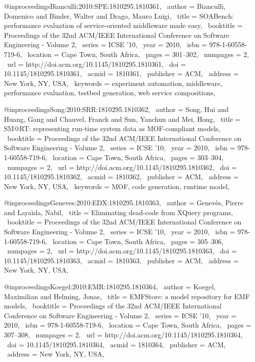 @inproceedings{Bianculli:2010:SPE:1810295.1810361,
 author = {Bianculli, Domenico and Binder, Walter and Drago, Mauro Luigi},
 title = {SOABench: performance evaluation of service-oriented middleware made easy},
 booktitle = {Proceedings of the 32nd ACM/IEEE International Conference on Software Engineering - Volume 2},
 series = {ICSE '10},
 year = {2010},
 isbn = {978-1-60558-719-6},
 location = {Cape Town, South Africa},
 pages = {301--302},
 numpages = {2},
 url = {http://doi.acm.org/10.1145/1810295.1810361},
 doi = {10.1145/1810295.1810361},
 acmid = {1810361},
 publisher = {ACM},
 address = {New York, NY, USA},
 keywords = {experiment automation, middleware, performance evaluation, testbed generation, web service compositions},
} 

@inproceedings{Song:2010:SRR:1810295.1810362,
 author = {Song, Hui and Huang, Gang and Chauvel, Franck and Sun, Yanchun and Mei, Hong},
 title = {SM@RT: representing run-time system data as MOF-compliant models},
 booktitle = {Proceedings of the 32nd ACM/IEEE International Conference on Software Engineering - Volume 2},
 series = {ICSE '10},
 year = {2010},
 isbn = {978-1-60558-719-6},
 location = {Cape Town, South Africa},
 pages = {303--304},
 numpages = {2},
 url = {http://doi.acm.org/10.1145/1810295.1810362},
 doi = {10.1145/1810295.1810362},
 acmid = {1810362},
 publisher = {ACM},
 address = {New York, NY, USA},
 keywords = {MOF, code generation, runtime model},
} 

@inproceedings{Geneves:2010:EDX:1810295.1810363,
 author = {Genev\`{e}s, Pierre and Laya\"{\i}da, Nabil},
 title = {Eliminating dead-code from XQuery programs},
 booktitle = {Proceedings of the 32nd ACM/IEEE International Conference on Software Engineering - Volume 2},
 series = {ICSE '10},
 year = {2010},
 isbn = {978-1-60558-719-6},
 location = {Cape Town, South Africa},
 pages = {305--306},
 numpages = {2},
 url = {http://doi.acm.org/10.1145/1810295.1810363},
 doi = {10.1145/1810295.1810363},
 acmid = {1810363},
 publisher = {ACM},
 address = {New York, NY, USA},
} 

@inproceedings{Koegel:2010:EMR:1810295.1810364,
 author = {Koegel, Maximilian and Helming, Jonas},
 title = {EMFStore: a model repository for EMF models},
 booktitle = {Proceedings of the 32nd ACM/IEEE International Conference on Software Engineering - Volume 2},
 series = {ICSE '10},
 year = {2010},
 isbn = {978-1-60558-719-6},
 location = {Cape Town, South Africa},
 pages = {307--308},
 numpages = {2},
 url = {http://doi.acm.org/10.1145/1810295.1810364},
 doi = {10.1145/1810295.1810364},
 acmid = {1810364},
 publisher = {ACM},
 address = {New York, NY, USA},
} 


